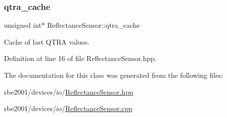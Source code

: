\mbox{\label{class_reflectance_sensor_ab4b708129419215a57eec3b0af611542}} 
\subsubsection{\texorpdfstring{qtra\+\_\+cache}{qtra\_cache}}
{\footnotesize\ttfamily unsigned int$\ast$ Reflectance\+Sensor\+::qtra\+\_\+cache\hspace{0.3cm}{\ttfamily [private]}}



Cache of last Q\+T\+RA values. 



Definition at line 16 of file Reflectance\+Sensor.\+hpp.



The documentation for this class was generated from the following files\+:\begin{DoxyCompactItemize}
\item 
rbe2001/devices/io/\hyperlink{_reflectance_sensor_8hpp}{Reflectance\+Sensor.\+hpp}\item 
rbe2001/devices/io/\hyperlink{_reflectance_sensor_8cpp}{Reflectance\+Sensor.\+cpp}\end{DoxyCompactItemize}

